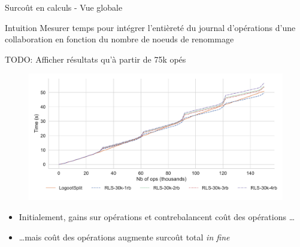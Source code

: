 \begin{frame}{Surcoût en calculs - Vue globale}
    \begin{block}{Intuition}
        Mesurer temps pour intégrer l'entièreté du journal d'opérations d'une collaboration en fonction du \alert{nombre de noeuds de renommage}
    \end{block}
    TODO: Afficher résultats qu'à partir de 75k opés
    \begin{figure}[!ht]
        \includegraphics[width=\columnwidth]{img/replay-log-30k-2022-10-27}
      \end{figure}
    \begin{itemize}
        \item Initialement, gains sur opérations \ins et \rmv contrebalancent coût des opérations \ren \dots
        \item \dots mais coût des opérations \ren augmente surcoût total \emph{in fine}
    \end{itemize}
\end{frame}
